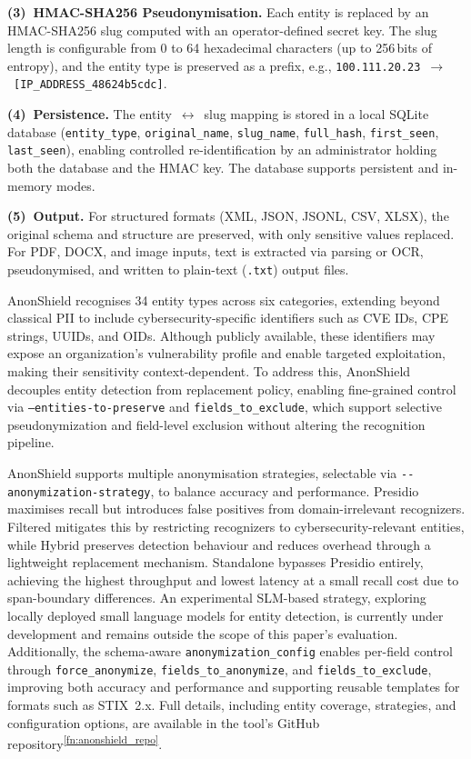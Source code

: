 \documentclass[12pt]{article}
\begin{document}
\textbf{(3)~HMAC-SHA256 Pseudonymisation.}
Each entity is replaced by an HMAC-SHA256 slug computed with an operator-defined secret key. The slug length is configurable from 0 to 64 hexadecimal characters (up to 256\,bits of entropy), and the entity type is preserved as a prefix, e.g., \texttt{100.111.20.23}~$\to$~\texttt{[IP\_ADDRESS\_48624b5cdc]}.

\textbf{(4)~Persistence.}
The entity~$\leftrightarrow$~slug mapping is stored in a local SQLite database (\texttt{entity\_type}, \texttt{original\_name}, \texttt{slug\_name}, \texttt{full\_hash}, \texttt{first\_seen}, \texttt{last\_seen}), enabling controlled re-identification by an administrator holding both the database and the HMAC key. The database supports persistent and in-memory modes.

\textbf{(5)~Output.}
For structured formats (XML, JSON, JSONL, CSV, XLSX), the original schema and structure are preserved, with only sensitive values replaced. For PDF, DOCX, and image inputs, text is extracted via parsing or OCR, pseudonymised, and written to plain-text (\texttt{.txt}) output files.

AnonShield recognises 34 entity types across six categories, extending beyond classical PII to include cybersecurity-specific identifiers such as CVE IDs, CPE strings, UUIDs, and OIDs. Although publicly available, these identifiers may expose an organization’s vulnerability profile and enable targeted exploitation, making their sensitivity context-dependent. To address this, AnonShield decouples entity detection from replacement policy, enabling fine-grained control via \texttt{--entities-to-preserve} and \texttt{fields\_to\_exclude}, which support selective pseudonymization and field-level exclusion without altering the recognition pipeline.

AnonShield supports multiple anonymisation strategies, selectable via \texttt{-{}-anonymization-strategy}, to balance accuracy and performance. Presidio maximises recall but introduces false positives from domain-irrelevant recognizers. Filtered mitigates this by restricting recognizers to cybersecurity-relevant entities, while Hybrid preserves detection behaviour and reduces overhead through a lightweight replacement mechanism. Standalone bypasses Presidio entirely, achieving the highest throughput and lowest latency at a small recall cost due to span-boundary differences. An experimental SLM-based strategy, exploring locally deployed small language models for entity detection, is currently under development and remains outside the scope of this paper's evaluation. Additionally, the schema-aware \texttt{anonymization\_config} enables per-field control through \texttt{force\_anonymize}, \texttt{fields\_to\_anonymize}, and \texttt{fields\_to\_exclude}, improving both accuracy and performance and supporting reusable templates for formats such as STIX~2.x. Full details, including entity coverage, strategies, and configuration options, are available in the tool's GitHub repository\textsuperscript{\ref{fn:anonshield_repo}}.
 
\end{document}
